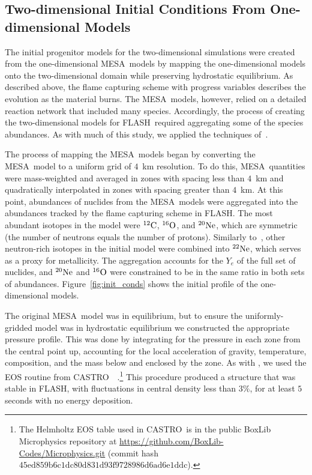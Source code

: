 \documentclass[iop,apj]{emulateapj}
\newcommand{\figref}[1]{Figure~\ref{#1}}
\newcommand{\C}[1]{\ensuremath{{}^{#1}{\rm C}}}
\newcommand{\Ox}[1]{\ensuremath{{}^{#1}{\rm O}}}
\newcommand{\Ne}[1]{\ensuremath{{}^{#1}{\rm Ne}}}
\newcommand{\code}[1]{\textsc{#1}}
\newcommand{\FLASH}{\code{FLASH}}
\newcommand{\CASTRO}{\code{CASTRO}}
\newcommand{\MESA}{\code{MESA}}
\begin{document}
\subsection{Two-dimensional Initial Conditions From One-dimensional Models}

The initial progenitor models for the two-dimensional simulations were
created from the one-dimensional \MESA\ models by mapping the one-dimensional
models onto the two-dimensional domain while
preserving hydrostatic equilibrium.
As described above, the flame capturing scheme with progress
variables describes the evolution as the material burns. The \MESA\
models, however, relied on a detailed reaction network that included
many species. Accordingly, the process of creating the two-dimensional
models for \FLASH\ required aggregating some of the species abundances.
As with much of this study, we applied the
techniques of~\citet{willcoxetal2016}.


The process of mapping the \MESA\ models began by converting
the \MESA\ model to a uniform grid of $4$~km resolution.
{\color{blue}To do this, \MESA\ quantities were mass-weighted and averaged in zones with spacing less than $4$~km
and quadratically interpolated in zones with spacing greater than $4$~km.}
At this point,
abundances of nuclides from the \MESA\ models were aggregated
into the abundances tracked by the flame capturing scheme in
\FLASH.
The most abundant isotopes in the model were \C{12}, \Ox{16},
and \Ne{20}, which are symmetric (the number of neutrons
equals the number of protons). Similarly to~\citet{willcoxetal2016},
other neutron-rich isotopes in the initial model were combined into
\Ne{22}, which serves as a proxy for metallicity. The aggregation
accounts for the $Y_e$ of the full set of nuclides, and \Ne{20}
and \Ox{16} were constrained to be in the same ratio in both
sets of abundances. \figref{fig:init_conds} shows the initial
profile of the one-dimensional models.

The original \MESA\ model was in equilibrium, but to ensure
the uniformly-gridded model was in hydrostatic equilibrium we
constructed the appropriate pressure profile. This was done by
integrating for the pressure in each zone from the central point up,
accounting for the local acceleration of gravity, temperature,
composition, and the mass below and enclosed by the zone. As
with \citet{willcoxetal2016}, we used the EOS routine from
\CASTRO\ ~\citep{timmes.swesty:accuracy,castro1}.\footnote{The
Helmholtz EOS table used in \CASTRO\ is in the public BoxLib
Microphysics repository at
  \url{https://github.com/BoxLib-Codes/Microphysics.git} (commit
  hash $\mathrm{45ed859b6c1dc80d831d93f9728986d6ad6e1ddc}$).} 
This procedure produced a structure that was stable in \FLASH, with 
fluctuations in central density less than $3\%$, for at least $5$ 
seconds with no energy deposition.
\end{document}
